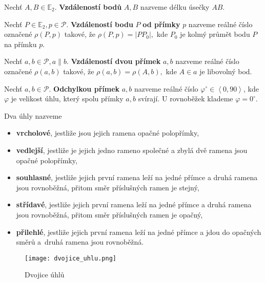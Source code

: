 \begin{definition}
  Nechť $A,B\in \mathbb E_2$. \textbf{Vzdáleností bodů} $A,B$ nazveme délku úsečky $AB.$
\end{definition}


\begin{definition}
  Nechť $P\in \mathbb E_2, p \in \mathscr P.$ \textbf{Vzdáleností bodu} $P$ \textbf{od přímky} $p$ nazveme reálné číslo označené $\rho(P,p)$ takové, že $\rho(P,p)=|PP_0|,$ kde $P_0$ je kolmý průmět bodu $P$ na přímku $p$.
\end{definition}

\begin{definition}
  Nechť $a,b \in \mathscr P, a \parallel b.$ \textbf{Vzdáleností dvou přímek} $a,b$ nazveme reálné číslo označené $\rho(a,b)$ takové, že $\rho(a,b)=\rho(A,b),$ kde $A\in a$ je libovolný bod.
\end{definition}

\begin{definition}
  Nechť $a,b\in \mathscr P.$ \textbf{Odchylkou přímek} $a,b$ nazveme reálné číslo $\varphi^\circ\in \left <0, 90\right>$, kde $\varphi$ je velikost úhlu, který spolu přímky $a,b$ svírají. U rovnoběžek klademe $\varphi = 0^\circ.$
\end{definition}

\begin{definition}
  Dva úhly nazveme
  \begin{itemize}
    \item \textbf{vrcholové}, jestliže jsou jejich ramena opačné polopřímky,
    \item \textbf{vedlejší}, jestliže je jejich jedno rameno společné a zbylá dvě ramena jsou opačné polopřímky,
    \item \textbf{souhlasné}, jestliže jejich první ramena leží na jedné přímce a druhá ramena jsou rovnoběžná, přitom směr příslušných ramen je stejný,
    \item \textbf{střídavé}, jestliže jejich první ramena leží na jedné přímce a druhá ramena jsou rovnoběžná, přitom směr příslušných ramen je opačný,
    \item \textbf{přilehlé}, jestliže jejich první ramena leží na jedné přímce a jdou do opačných směrů a~druhá ramena jsou rovnoběžná.
  \end{itemize}
  \begin{figure}[h!]
    \centering
    \texttt{[image: dvojice\_uhlu.png]}
    \caption{Dvojice úhlů}
  \end{figure}
\end{definition}


